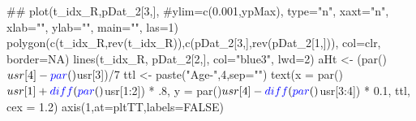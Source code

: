 \documentclass[11pt,]{article}
\newenvironment{Shaded}{}{}
\newcommand{\KeywordTok}[1]{\textcolor[rgb]{0.00,0.00,1.00}{#1}}
\newcommand{\DataTypeTok}[1]{#1}
\newcommand{\DecValTok}[1]{#1}
\newcommand{\FloatTok}[1]{#1}
\newcommand{\StringTok}[1]{\textcolor[rgb]{0.00,0.50,0.50}{#1}}
\newcommand{\CommentTok}[1]{\textcolor[rgb]{0.00,0.50,0.00}{#1}}
\newcommand{\OtherTok}[1]{\textcolor[rgb]{1.00,0.25,0.00}{#1}}
\newcommand{\OperatorTok}[1]{#1}
\newcommand{\NormalTok}[1]{#1}
\begin{document}
\begin{Shaded}
\begin{Highlighting}[]
\NormalTok{    ##}
        \KeywordTok{plot}\NormalTok{(t_idx_R,pDat_}\DecValTok{2}\NormalTok{[}\DecValTok{3}\NormalTok{,], }\CommentTok{#ylim=c(0.001,ypMax),}
         \DataTypeTok{type=}\StringTok{"n"}\NormalTok{, }\DataTypeTok{xaxt=}\StringTok{"n"}\NormalTok{, }\DataTypeTok{xlab=}\StringTok{""}\NormalTok{, }\DataTypeTok{ylab=}\StringTok{""}\NormalTok{, }\DataTypeTok{main=}\StringTok{""}\NormalTok{, }\DataTypeTok{las=}\DecValTok{1}\NormalTok{)}
    \KeywordTok{polygon}\NormalTok{(}\KeywordTok{c}\NormalTok{(t_idx_R,}\KeywordTok{rev}\NormalTok{(t_idx_R)),}\KeywordTok{c}\NormalTok{(pDat_}\DecValTok{2}\NormalTok{[}\DecValTok{3}\NormalTok{,],}\KeywordTok{rev}\NormalTok{(pDat_}\DecValTok{2}\NormalTok{[}\DecValTok{1}\NormalTok{,])), }\DataTypeTok{col=}\NormalTok{clr, }\DataTypeTok{border=}\OtherTok{NA}\NormalTok{)}
    \KeywordTok{lines}\NormalTok{(t_idx_R, pDat_}\DecValTok{2}\NormalTok{[}\DecValTok{2}\NormalTok{,], }\DataTypeTok{col=}\StringTok{"blue3"}\NormalTok{, }\DataTypeTok{lwd=}\DecValTok{2}\NormalTok{)}
\NormalTok{    aHt <-}\StringTok{ }\NormalTok{(}\KeywordTok{par}\NormalTok{()}\OperatorTok{$}\NormalTok{usr[}\DecValTok{4}\NormalTok{]}\OperatorTok{-}\KeywordTok{par}\NormalTok{()}\OperatorTok{$}\NormalTok{usr[}\DecValTok{3}\NormalTok{])}\OperatorTok{/}\DecValTok{7}
\NormalTok{    ttl <-}\StringTok{ }\KeywordTok{paste}\NormalTok{(}\StringTok{"Age-"}\NormalTok{,}\DecValTok{4}\NormalTok{,}\DataTypeTok{sep=}\StringTok{""}\NormalTok{)}
    \KeywordTok{text}\NormalTok{(}\DataTypeTok{x =} \KeywordTok{par}\NormalTok{()}\OperatorTok{$}\NormalTok{usr[}\DecValTok{1}\NormalTok{] }\OperatorTok{+}\StringTok{ }\KeywordTok{diff}\NormalTok{(}\KeywordTok{par}\NormalTok{()}\OperatorTok{$}\NormalTok{usr[}\DecValTok{1}\OperatorTok{:}\DecValTok{2}\NormalTok{]) }\OperatorTok{*}\StringTok{ }\NormalTok{.}\DecValTok{8}\NormalTok{,}
       \DataTypeTok{y =} \KeywordTok{par}\NormalTok{()}\OperatorTok{$}\NormalTok{usr[}\DecValTok{4}\NormalTok{] }\OperatorTok{-}\StringTok{ }\KeywordTok{diff}\NormalTok{(}\KeywordTok{par}\NormalTok{()}\OperatorTok{$}\NormalTok{usr[}\DecValTok{3}\OperatorTok{:}\DecValTok{4}\NormalTok{]) }\OperatorTok{*}\StringTok{ }\FloatTok{0.1}\NormalTok{,}
\NormalTok{       ttl,}
       \DataTypeTok{cex =} \FloatTok{1.2}\NormalTok{)}
    \KeywordTok{axis}\NormalTok{(}\DecValTok{1}\NormalTok{,}\DataTypeTok{at=}\NormalTok{pltTT,}\DataTypeTok{labels=}\OtherTok{FALSE}\NormalTok{)}
    

\end{Highlighting}
\end{Shaded}
\end{document}
